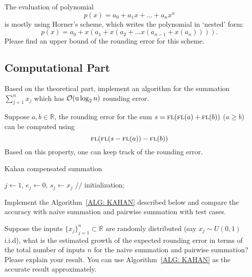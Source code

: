 \begin{problem}
\label{Prb: 1-Theo-3}
The evaluation of polynomial 
    $$p(x) = a_0 + a_1 x + \dots + a_n x^n$$
is mostly using Horner's scheme, which writes the polynomial in `nested' form:
\begin{equation}
p(x) = a_0 + x (a_1 + x(a_2 + \dots x(a_{n-1} + x(a_n)))).
\end{equation}                                
Please find an upper bound of the rounding error for this scheme.         
\end{problem}

\subsection{Computational Part}

\begin{problem}
    Based on the theoretical part, implement an algorithm for the summation $\sum_{j=1}^n x_j$ which has $\mathcal O(\textup{u}\log_2 n)$ rounding error.
\end{problem}

\begin{problem} 
\label{Prb: 1-Kahan-Sum}
Suppose $a, b\in\mathbb{R}$, the rounding error for the sum $s = {\textsc{fl}}({\textsc{fl}}(a)+{\textsc{fl}}(b))$ ($a\ge b$) can be computed using 
    $${\textsc{fl}}({\textsc{fl}}(s - {\textsc{fl}}(a))-{\textsc{fl}}(b))$$
    Based on this property, one can keep track of the rounding error. 
\begin{algorithm}[!htb]
    \SetAlgoLined
    \caption{Kahan compensated summation}
    $j\gets 1$, $e_j \gets 0$, $s_j \gets x_j$ //    initialization; 
    \\
    \label{ALG: KAHAN}
\end{algorithm}
    Implement the Algorithm~\ref{ALG: KAHAN} described below and compare the accuracy with naive summation and pairwise summation with test cases.
\end{problem}


\begin{problem}
    Suppose the inputs $\{x_j\}_{j=1}^n\subset \mathbb{R}$ are randomly distributed (say $x_j\sim U(0,1)$ i.i.d), what is the estimated growth of the expected rounding error in terms of the total number of inputs $n$ for the naive summation and pairwise summation? Please explain your result. You can use Algorithm~\ref{ALG: KAHAN} as the accurate result approximately. 
\end{problem}
\newpage
\nocite{higham1993accuracy,higham2019new,muller2006elementary}


